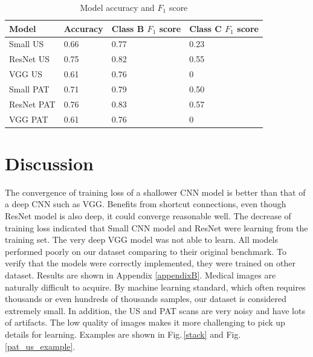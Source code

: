 \begin{table}[h]
\centering
\begin{tabular}{ |p{3cm}||p{3cm}|p{3cm}|p{3cm}|  }
 \hline
 Model       & Accuracy & Class B $F_1$ score & Class C $F_1$ score\\
 \hline
 Small  US   & 0.66  & 0.77 &  0.23\\
 ResNet US   & 0.75  & 0.82 &  0.55\\
 VGG US      & 0.61  & 0.76 &  0\\
 Small PAT   & 0.71  & 0.79 &  0.50\\
 ResNet PAT  & 0.76  & 0.83 &  0.57\\
 VGG PAT     & 0.61  & 0.76 &  0\\
 \hline
\end{tabular}
\caption{Model accuracy and $F_1$ score}
\label{acctable}
\end{table}

\section{Discussion}
The convergence of training loss of a shallower CNN model is better than that of a deep CNN such as VGG. Benefits from shortcut connections, even though ResNet model is also deep, it could converge reasonable well. The decrease of training loss indicated that Small CNN model and ResNet were learning from the training set. The very deep VGG model was not able to learn. All models performed poorly on our dataset comparing to their original benchmark. To verify that the models were correctly implemented, they were trained on other dataset. Results are shown in Appendix \ref{appendixB}. Medical images are naturally difficult to acquire. By machine learning standard, which often requires thousands or even hundreds of thousands samples, our dataset is considered extremely small. In addition, the US and PAT scans are very noisy and have lots of artifacts. The low quality of images makes it more challenging to pick up details for learning. Examples are shown in Fig.\,\ref{stack} and Fig.\,\ref{pat_us_example}.

